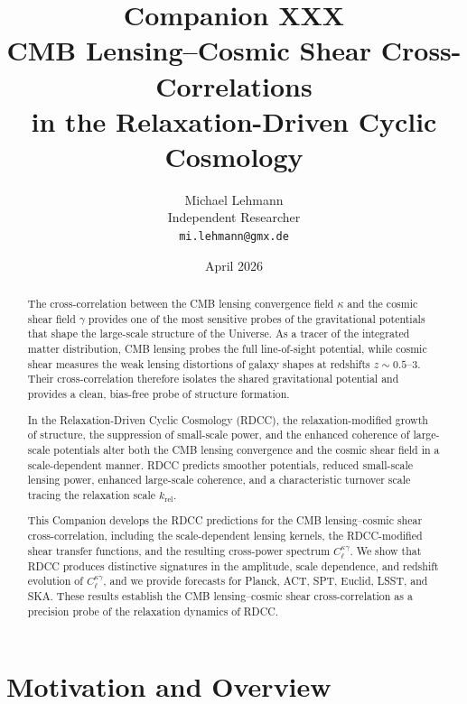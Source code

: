 \documentclass[11pt,a4paper]{article}
\title{
\textbf{Companion XXX}\\[4mm]
\textbf{CMB Lensing--Cosmic Shear Cross-Correlations}\\
\textbf{in the Relaxation-Driven Cyclic Cosmology}
}
\author{
Michael Lehmann\\
Independent Researcher\\
\texttt{mi.lehmann@gmx.de}
}
\date{April 2026}
\begin{document}
\maketitle

\begin{abstract}
The cross-correlation between the CMB lensing convergence field $\kappa$ and the cosmic 
shear field $\gamma$ provides one of the most sensitive probes of the gravitational 
potentials that shape the large-scale structure of the Universe. As a tracer of the 
integrated matter distribution, CMB lensing probes the full line-of-sight potential, while 
cosmic shear measures the weak lensing distortions of galaxy shapes at redshifts 
$z \sim 0.5$–$3$. Their cross-correlation therefore isolates the shared gravitational 
potential and provides a clean, bias-free probe of structure formation.

In the Relaxation-Driven Cyclic Cosmology (RDCC), the relaxation-modified growth of 
structure, the suppression of small-scale power, and the enhanced coherence of large-scale 
potentials alter both the CMB lensing convergence and the cosmic shear field in a 
scale-dependent manner. RDCC predicts smoother potentials, reduced small-scale lensing 
power, enhanced large-scale coherence, and a characteristic turnover scale tracing the 
relaxation scale $k_{\mathrm{rel}}$.

This Companion develops the RDCC predictions for the CMB lensing–cosmic shear 
cross-correlation, including the scale-dependent lensing kernels, the RDCC-modified shear 
transfer functions, and the resulting cross-power spectrum $C_{\ell}^{\kappa \gamma}$. We 
show that RDCC produces distinctive signatures in the amplitude, scale dependence, and 
redshift evolution of $C_{\ell}^{\kappa \gamma}$, and we provide forecasts for Planck, ACT, 
SPT, Euclid, LSST, and SKA. These results establish the CMB lensing–cosmic shear 
cross-correlation as a precision probe of the relaxation dynamics of RDCC.
\end{abstract}

\section{Motivation and Overview}
\end{document}
